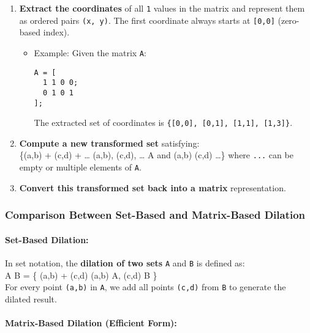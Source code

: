 \documentclass[11pt]{amsart}
\theoremstyle{remark}
\theoremstyle{definition}
\theoremstyle{remark}
\numberwithin{equation}{section}
\begin{document}
\begin{enumerate}
\def\labelenumi{\arabic{enumi}.}
\item
  \textbf{Extract the coordinates} of all \texttt{1} values in the
  matrix and represent them as ordered pairs \texttt{(x,\ y)}. The first
  coordinate always starts at \texttt{{[}0,0{]}} (zero-based index).

  \begin{itemize}
  \item
    Example: Given the matrix \texttt{A}:

\begin{verbatim}
A = [
  1 1 0 0;
  0 1 0 1
];
\end{verbatim}

    The extracted set of coordinates is
    \texttt{\{{[}0,0{]},\ {[}0,1{]},\ {[}1,1{]},\ {[}1,3{]}\}}.
  \end{itemize}
\item
  \textbf{Compute a new transformed set} satisfying:\\
  \{(a,b) + (c,d) + \ldots{} \textbar{} (a,b), (c,d), \ldots{} \in A and
  (a,b) \neq (c,d) \neq \ldots\} where \texttt{...} can be empty or multiple
  elements of \texttt{A}.
\item
  \textbf{Convert this transformed set back into a matrix}
  representation.
\end{enumerate}

\subsubsection{Comparison Between Set-Based and Matrix-Based
Dilation}\label{comparison-between-set-based-and-matrix-based-dilation}

\paragraph{Set-Based Dilation:}\label{set-based-dilation}

In set notation, the \textbf{dilation of two sets} \texttt{A} and
\texttt{B} is defined as:\\
A \oplus  B = \{ (a,b) + (c,d) \textbar{} (a,b) \in A, (c,d) \in B \}\\
For every point \texttt{(a,b)} in \texttt{A}, we add all points
\texttt{(c,d)} from \texttt{B} to generate the dilated result.

\paragraph{Matrix-Based Dilation (Efficient
Form):}\label{matrix-based-dilation-efficient-form}
\end{document}
